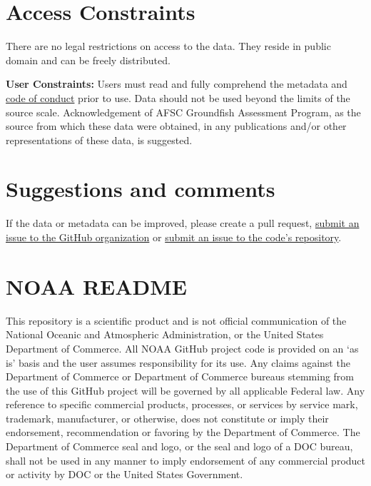 \documentclass[
  letterpaper,
  oneside,
  open=any]{scrbook}
\begin{document}
\hypertarget{access-constraints}{%
\section*{Access Constraints}\label{access-constraints}}


There are no legal restrictions on access to the data. They reside in
public domain and can be freely distributed.

\textbf{User Constraints:} Users must read and fully comprehend the
metadata and
\href{https://afsc-gap-products.github.io/gap_products/content/code-of-conduct.html}{code
of conduct} prior to use. Data should not be used beyond the limits of
the source scale. Acknowledgement of AFSC Groundfish Assessment Program,
as the source from which these data were obtained, in any publications
and/or other representations of these data, is suggested.

\hypertarget{suggestions-and-comments}{%
\section*{Suggestions and comments}\label{suggestions-and-comments}}


If the data or metadata can be improved, please create a pull request,
\href{https://github.com/afsc-gap-products/data-requests/issues}{submit
an issue to the GitHub organization} or
\href{https://github.com/afsc-gap-products/gap_products/issues}{submit
an issue to the code's repository}.

\hypertarget{noaa-readme}{%
\section*{NOAA README}\label{noaa-readme}}


This repository is a scientific product and is not official
communication of the National Oceanic and Atmospheric Administration, or
the United States Department of Commerce. All NOAA GitHub project code
is provided on an `as is' basis and the user assumes responsibility for
its use. Any claims against the Department of Commerce or Department of
Commerce bureaus stemming from the use of this GitHub project will be
governed by all applicable Federal law. Any reference to specific
commercial products, processes, or services by service mark, trademark,
manufacturer, or otherwise, does not constitute or imply their
endorsement, recommendation or favoring by the Department of Commerce.
The Department of Commerce seal and logo, or the seal and logo of a DOC
bureau, shall not be used in any manner to imply endorsement of any
commercial product or activity by DOC or the United States Government.
\end{document}
